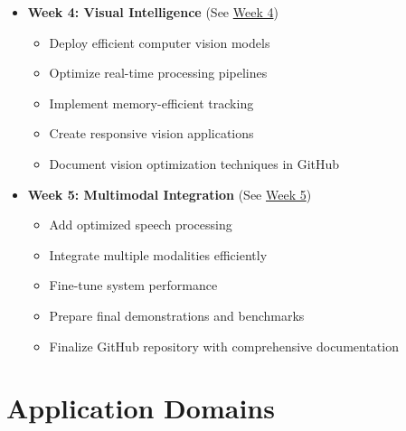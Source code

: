 \documentclass[11pt]{article}
\begin{document}
\begin{center}
{\begin{minipage}{0.95\textwidth}
\begin{itemize}
					\item \textbf{Week 4: Visual Intelligence} (See \hyperref[sec:week4]{Week 4})
					\begin{itemize}
						\item Deploy efficient computer vision models
						\item Optimize real-time processing pipelines
						\item Implement memory-efficient tracking
						\item Create responsive vision applications
						\item Document vision optimization techniques in GitHub
					\end{itemize}
					
					\item \textbf{Week 5: Multimodal Integration} (See \hyperref[sec:week5]{Week 5})
					\begin{itemize}
						\item Add optimized speech processing
						\item Integrate multiple modalities efficiently
						\item Fine-tune system performance
						\item Prepare final demonstrations and benchmarks
						\item Finalize GitHub repository with comprehensive documentation
					\end{itemize}
				\end{itemize}
		\end{minipage}}
	\end{center}
	
	\section{Application Domains}
	\label{sec:domains}
	
\end{document}
